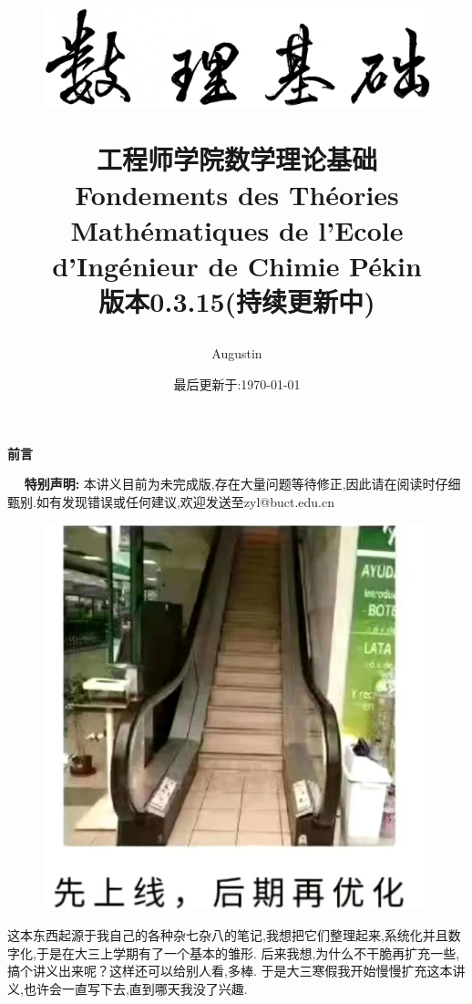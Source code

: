\documentclass[12pt, a4paper, oneside]{ctexbook}
\title{
  \begin{figure}[!t]%
    \centering
    \includegraphics[width=14cm]{shulijichu-2.png}
  \end{figure}
  {\Huge{\textbf{工程师学院数学理论基础\\
Fondements des Théories Mathématiques de l'Ecole d'Ingénieur de Chimie Pékin}}}\\
版本0.3.15(持续更新中)}
\author{Augustin}
\date{最后更新于:\today}
\begin{document}

\maketitle

\setcounter{page}{1}

\begin{center}
    \Huge\textbf{前言}
\end{center}~\
\noindent
\textbf{特别声明:}
本讲义目前为未完成版,存在大量问题等待修正,因此请在阅读时仔细甄别.如有发现错误或任何建议,欢迎发送至zyl@buct.edu.cn\\
\begin{figure}[H]%
  \centering
  \includegraphics[scale=0.6]{xianshangxian_zaiyouhua.jpg}
\end{figure}


\indent
这本东西起源于我自己的各种杂七杂八的笔记,我想把它们整理起来,系统化并且数字化,于是在大三上学期有了一个基本的雏形.
后来我想,为什么不干脆再扩充一些,搞个讲义出来呢？这样还可以给别人看,多棒.
于是大三寒假我开始慢慢扩充这本讲义,也许会一直写下去,直到哪天我没了兴趣.
\end{document}
